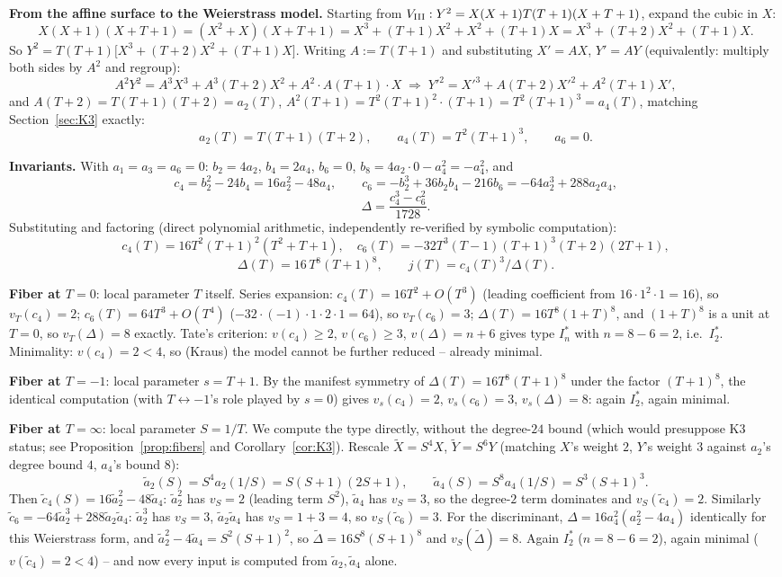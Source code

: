 \documentclass[11pt]{amsart}
\theoremstyle{definition}
\begin{document}
\textbf{From the affine surface to the Weierstrass model.} Starting from
$V_{\rm III}:Y^2=X(X+1)T(T+1)(X+T+1)$, expand the cubic in $X$:
\[
X(X+1)(X+T+1) = (X^2+X)(X+T+1) = X^3+(T+1)X^2+X^2+(T+1)X = X^3+(T+2)X^2+(T+1)X.
\]
So $Y^2=T(T+1)\bigl[X^3+(T+2)X^2+(T+1)X\bigr]$. Writing $A:=T(T+1)$ and
substituting $X'=AX$, $Y'=AY$ (equivalently: multiply both sides by
$A^2$ and regroup):
\[
A^2Y^2 = A^3X^3+A^3(T+2)X^2+A^2\cdot A(T+1)\cdot X
\;\Longrightarrow\; Y'^2 = X'^3 + A(T+2)X'^2 + A^2(T+1)X',
\]
and $A(T+2)=T(T+1)(T+2)=a_2(T)$, $A^2(T+1)=T^2(T+1)^2\cdot(T+1)=T^2(T+1)^3=a_4(T)$,
matching Section~\ref{sec:K3} exactly:
\[
a_2(T)=T(T+1)(T+2),\qquad a_4(T)=T^2(T+1)^3,\qquad a_6=0.
\]

\textbf{Invariants.} With $a_1=a_3=a_6=0$: $b_2=4a_2$, $b_4=2a_4$,
$b_6=0$, $b_8=4a_2\cdot0-a_4^2=-a_4^2$, and
\[
c_4=b_2^2-24b_4=16a_2^2-48a_4,\qquad c_6=-b_2^3+36b_2b_4-216b_6=-64a_2^3+288a_2a_4,
\]
\[
\Delta = \frac{c_4^3-c_6^2}{1728}.
\]
Substituting and factoring (direct polynomial arithmetic, independently
re-verified by symbolic computation):
\[
c_4(T)=16T^2(T+1)^2(T^2+T+1),\quad c_6(T)=-32T^3(T-1)(T+1)^3(T+2)(2T+1),
\]
\[
\Delta(T)=16\,T^8(T+1)^8,\qquad j(T)=c_4(T)^3/\Delta(T).
\]

\textbf{Fiber at $T=0$}: local parameter $T$ itself. Series expansion:
$c_4(T)=16T^2+O(T^3)$ (leading coefficient from $16\cdot1^2\cdot1=16$),
so $v_T(c_4)=2$; $c_6(T)=64T^3+O(T^4)$ ($-32\cdot(-1)\cdot1\cdot2\cdot1=64$),
so $v_T(c_6)=3$; $\Delta(T)=16T^8(1+T)^8$, and $(1+T)^8$ is a unit at
$T=0$, so $v_T(\Delta)=8$ exactly. Tate's criterion: $v(c_4)\geq2$,
$v(c_6)\geq3$, $v(\Delta)=n+6$ gives type $I_n^*$ with $n=8-6=2$, i.e.\
$I_2^*$. Minimality: $v(c_4)=2<4$, so (Kraus) the model cannot be
further reduced -- already minimal.

\textbf{Fiber at $T=-1$}: local parameter $s=T+1$. By the manifest
symmetry of $\Delta(T)=16T^8(T+1)^8$ under the factor $(T+1)^8$, the
identical computation (with $T\leftrightarrow-1$'s role played by $s=0$)
gives $v_s(c_4)=2$, $v_s(c_6)=3$, $v_s(\Delta)=8$: again $I_2^*$, again
minimal.

\textbf{Fiber at $T=\infty$}: local parameter $S=1/T$. We compute the
type directly, without the degree-$24$ bound (which would presuppose K3
status; see Proposition~\ref{prop:fibers} and
Corollary~\ref{cor:K3}). Rescale
$\tilde X=S^4X$, $\tilde Y=S^6Y$ (matching $X$'s weight $2$, $Y$'s weight
$3$ against $a_2$'s degree bound $4$, $a_4$'s bound $8$):
\[
\tilde a_2(S) = S^4a_2(1/S) = S(S+1)(2S+1),\qquad \tilde a_4(S)=S^8a_4(1/S)=S^3(S+1)^3.
\]
Then $\tilde c_4(S)=16\tilde a_2^2-48\tilde a_4$: $\tilde a_2^2$ has
$v_S=2$ (leading term $S^2$), $\tilde a_4$ has $v_S=3$, so the
degree-$2$ term dominates and $v_S(\tilde c_4)=2$. Similarly
$\tilde c_6=-64\tilde a_2^3+288\tilde a_2\tilde a_4$: $\tilde a_2^3$ has
$v_S=3$, $\tilde a_2\tilde a_4$ has $v_S=1+3=4$, so $v_S(\tilde c_6)=3$.
For the discriminant, $\Delta=16a_4^2(a_2^2-4a_4)$ identically for this
Weierstrass form, and $\tilde a_2^2-4\tilde a_4=S^2(S+1)^2$, so
$\tilde\Delta=16S^8(S+1)^8$ and $v_S(\tilde\Delta)=8$. Again $I_2^*$
($n=8-6=2$), again minimal ($v(\tilde c_4)=2<4$) -- and now every input
is computed from $\tilde a_2,\tilde a_4$ alone.
\end{document}
